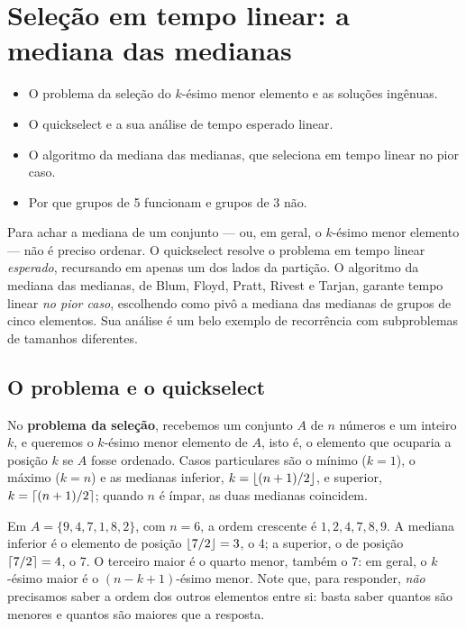\chapter{Seleção em tempo linear: a mediana das medianas}\label{cap:selecao}\label{sec:selecao}
\begin{objetivos}
\begin{itemize}
  \item O problema da seleção do $k$-ésimo menor elemento e as soluções ingênuas.
  \item O quickselect e a sua análise de tempo esperado linear.
  \item O algoritmo da mediana das medianas, que seleciona em tempo linear no pior caso.
  \item Por que grupos de 5 funcionam e grupos de 3 não.
\end{itemize}
\end{objetivos}

Para achar a mediana de um conjunto --- ou, em geral, o $k$-ésimo menor elemento --- não é preciso ordenar. O quickselect resolve o problema em tempo linear \emph{esperado}, recursando em apenas um dos lados da partição. O algoritmo da mediana das medianas, de Blum, Floyd, Pratt, Rivest e Tarjan, garante tempo linear \emph{no pior caso}, escolhendo como pivô a mediana das medianas de grupos de cinco elementos. Sua análise é um belo exemplo de recorrência com subproblemas de tamanhos diferentes.

\section{O problema e o quickselect}\label{sec:quickselect}
No \textbf{problema da seleção}, recebemos um conjunto $A$ de $n$ números e um inteiro $k$, e queremos o $k$-ésimo menor elemento de $A$, isto é, o elemento que ocuparia a posição $k$ se $A$ fosse ordenado. Casos particulares são o mínimo ($k=1$), o máximo ($k=n$) e as medianas inferior, $k=\lfloor(n+1)/2\rfloor$, e superior, $k=\lceil(n+1)/2\rceil$; quando $n$ é ímpar, as duas medianas coincidem.

\begin{exemplo}\label{ex:medianas}
Em $A=\{9,4,7,1,8,2\}$, com $n=6$, a ordem crescente é $1,2,4,7,8,9$. A mediana inferior é o elemento de posição $\lfloor7/2\rfloor=3$, o 4; a superior, o de posição $\lceil7/2\rceil=4$, o 7. O terceiro maior é o quarto menor, também o 7: em geral, o $k$-ésimo maior é o $(n-k+1)$-ésimo menor. Note que, para responder, \emph{não} precisamos saber a ordem dos outros elementos entre si: basta saber quantos são menores e quantos são maiores que a resposta.
\end{exemplo}

